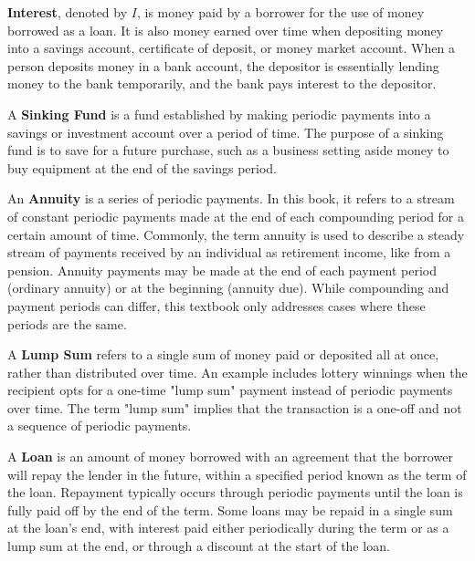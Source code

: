 \begin{definition}
    \textbf{Interest}, denoted by \( I \), is money paid by a borrower for the use of money borrowed as a loan. It is also money earned over time when depositing money into a savings account, certificate of deposit, or money market account. When a person deposits money in a bank account, the depositor is essentially lending money to the bank temporarily, and the bank pays interest to the depositor.
\end{definition}

\begin{definition}
    A \textbf{Sinking Fund} is a fund established by making periodic payments into a savings or investment account over a period of time. The purpose of a sinking fund is to save for a future purchase, such as a business setting aside money to buy equipment at the end of the savings period.
\end{definition}

\begin{definition}
    An \textbf{Annuity} is a series of periodic payments. In this book, it refers to a stream of constant periodic payments made at the end of each compounding period for a certain amount of time. Commonly, the term annuity is used to describe a steady stream of payments received by an individual as retirement income, like from a pension. Annuity payments may be made at the end of each payment period (ordinary annuity) or at the beginning (annuity due). While compounding and payment periods can differ, this textbook only addresses cases where these periods are the same.
\end{definition}

\begin{definition}
    A \textbf{Lump Sum} refers to a single sum of money paid or deposited all at once, rather than distributed over time. An example includes lottery winnings when the recipient opts for a one-time "lump sum" payment instead of periodic payments over time. The term "lump sum" implies that the transaction is a one-off and not a sequence of periodic payments.
\end{definition}

\begin{definition}
    A \textbf{Loan} is an amount of money borrowed with an agreement that the borrower will repay the lender in the future, within a specified period known as the term of the loan. Repayment typically occurs through periodic payments until the loan is fully paid off by the end of the term. Some loans may be repaid in a single sum at the loan's end, with interest paid either periodically during the term or as a lump sum at the end, or through a discount at the start of the loan.
\end{definition}
